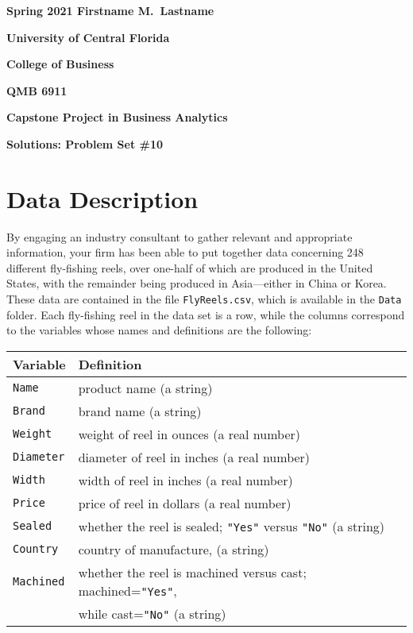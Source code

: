\documentclass[11pt]{paper}
\begin{document}

\pagestyle{empty}
{\noindent\bf Spring 2021 \hfill Firstname M.~Lastname}
\vskip 16pt
\centerline{\bf University of Central Florida}
\centerline{\bf College of Business}
\vskip 16pt
\centerline{\bf QMB 6911}
\centerline{\bf Capstone Project in Business Analytics}
\vskip 10pt
\centerline{\bf Solutions:  Problem Set \#10}
\vskip 32pt
\noindent
% 
% 
\section{Data Description}
% 
By engaging an industry consultant to gather relevant and appropriate 
information, your firm has been able to put together data concerning 248 
different fly-fishing reels, over one-half of which are produced in the 
United States, with the remainder being produced in Asia---either in China 
or Korea.  These data are contained in the file {\tt FlyReels.csv}, which is
available in the {\tt Data} folder.
Each fly-fishing reel in the data set is a row, while the columns correspond 
to the variables whose names and definitions are the following:
\bigskip
\begin{table}[ht]
\centering
\begin{tabular}{ll}
  \hline
    Variable & Definition \\
  \hline

    {\tt Name}        &product name (a string) \\ 
    {\tt Brand}       &brand name (a string) \\ 
    {\tt Weight}      &weight of reel in ounces (a real number) \\ 
    {\tt Diameter}    &diameter of reel in inches (a real number) \\ 
    {\tt Width}       &width of reel in inches (a real number) \\ 
    {\tt Price}       &price of reel in dollars (a real number) \\ 
    {\tt Sealed}      &whether the reel is sealed; {\tt "Yes"} versus
                        {\tt "No"} (a string) \\ 
    {\tt Country}     &country of manufacture, (a string) \\ 
    {\tt Machined}    &whether the reel is machined versus cast;
                        machined={\tt "Yes"}, \\ 
                      &while cast={\tt "No"} (a string) \\ 
  \hline
\end{tabular}
\end{table}
\end{document}
